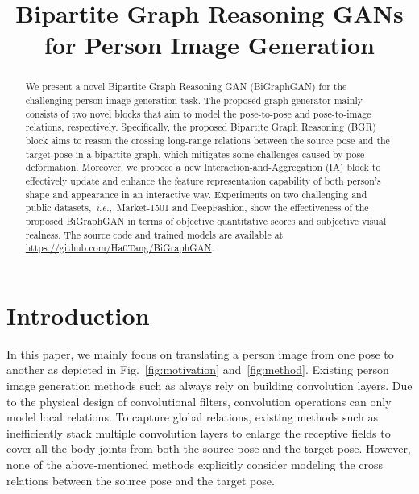\documentclass{bmvc2k}
\title{Bipartite Graph Reasoning GANs for Person Image Generation}
\begin{document}
\maketitle

\begin{abstract}
We present a novel Bipartite Graph Reasoning GAN (BiGraphGAN) for the challenging person image generation task.
The proposed graph generator mainly consists of two novel blocks that aim to model the pose-to-pose and pose-to-image relations, respectively. 
Specifically, the proposed Bipartite Graph Reasoning (BGR) block aims to reason the crossing long-range relations between the source pose and the target pose in a bipartite graph, which mitigates some challenges caused by pose deformation.
Moreover, we propose a new Interaction-and-Aggregation (IA) block to effectively update and enhance the feature representation capability of both person's shape and appearance in an interactive way.
Experiments on two challenging and public datasets,~\emph{i.e.},~Market-1501 and DeepFashion, show the effectiveness of the proposed BiGraphGAN in terms of objective quantitative scores and subjective visual realness.
The source code and trained models are available at
\url{https://github.com/Ha0Tang/BiGraphGAN}.
\end{abstract} \section{Introduction}
\label{sec:intro}
In this paper, we mainly focus on translating a person image from one pose to another as depicted in Fig.~\ref{fig:motivation} and~\ref{fig:method}.
Existing person image generation methods such as \cite{ma2017pose,ma2018disentangled,siarohin2018deformable,tang2019cycle,albahar2019guided,esser2018variational,zhu2019progressive,chan2019everybody,balakrishnan2018synthesizing,zanfir2018human,liang2019pcgan,liu2019liquid} always rely on building convolution layers. 
Due to the physical design of convolutional filters, convolution operations can only model local relations.
To capture global relations, existing methods such as \cite{zhu2019progressive,tang2019cycle} inefficiently stack multiple convolution layers to enlarge the receptive fields to cover all the body joints from both the source pose and the target pose.
However, none of the above-mentioned methods explicitly consider modeling the cross relations between the source pose and the target pose.
\end{document}
